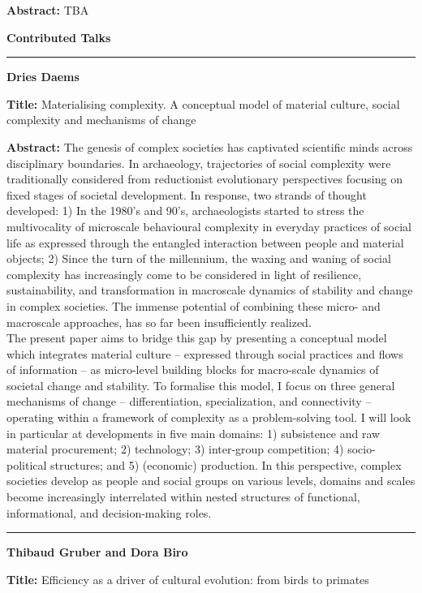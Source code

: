 \documentclass[]{article}
\begin{document}
\textbf{Abstract:} TBA

\begin{center}
    \Large
    {\bf Contributed Talks\\}
    \rule{4cm}{.4pt}
\end{center}


{\bf Dries Daems}

\textbf{Title:} Materialising complexity. A conceptual model of material
culture, social complexity and mechanisms of change

\textbf{Abstract:} The genesis of complex societies has captivated
scientific minds across disciplinary boundaries. In archaeology,
trajectories of social complexity were traditionally considered from
reductionist evolutionary perspectives focusing on fixed stages of
societal development. In response, two strands of thought developed: 1)
In the 1980's and 90's, archaeologists started to stress the
multivocality of microscale behavioural complexity in everyday practices
of social life as expressed through the entangled interaction between
people and material objects; 2) Since the turn of the millennium, the
waxing and waning of social complexity has increasingly come to be
considered in light of resilience, sustainability, and transformation in
macroscale dynamics of stability and change in complex societies. The
immense potential of combining these micro- and macroscale approaches,
has so far been insufficiently realized.\\
The present paper aims to bridge this gap by presenting a conceptual
model which integrates material culture -- expressed through social
practices and flows of information -- as micro-level building blocks for
macro-scale dynamics of societal change and stability. To formalise this
model, I focus on three general mechanisms of change -- differentiation,
specialization, and connectivity -- operating within a framework of
complexity as a problem-solving tool. I will look in particular at
developments in five main domains: 1) subsistence and raw material
procurement; 2) technology; 3) inter-group competition; 4)
socio-political structures; and 5) (economic) production. In this
perspective, complex societies develop as people and social groups on
various levels, domains and scales become increasingly interrelated
within nested structures of functional, informational, and
decision-making roles.

\rule{4cm}{.4pt}

{\bf {Thibaud Gruber and Dora Biro}}

\textbf{Title:} Efficiency as a driver of cultural evolution: from birds
to primates
\end{document}

